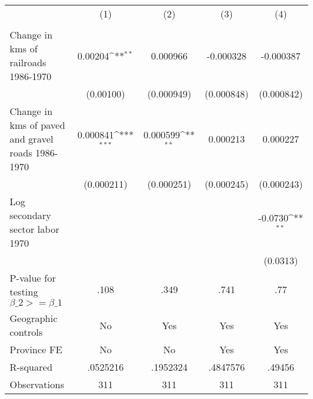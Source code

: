 {
\def\sym#1{\ifmmode^{#1}\else\(^{#1}\)\fi}
\begin{tabular}{l*{4}{c}}
\hline\hline
                &\multicolumn{1}{c}{(1)}&\multicolumn{1}{c}{(2)}&\multicolumn{1}{c}{(3)}&\multicolumn{1}{c}{(4)}\\
                &\multicolumn{1}{c}{}&\multicolumn{1}{c}{}&\multicolumn{1}{c}{}&\multicolumn{1}{c}{}\\
\hline
Change in kms of railroads 1986-1970&  0.00204\sym{**} & 0.000966         &-0.000328         &-0.000387         \\
                &(0.00100)         &(0.000949)         &(0.000848)         &(0.000842)         \\
[1em]
Change in kms of paved and gravel roads 1986-1970& 0.000841\sym{***}& 0.000599\sym{**} & 0.000213         & 0.000227         \\
                &(0.000211)         &(0.000251)         &(0.000245)         &(0.000243)         \\
[1em]
Log secondary sector labor 1970&                  &                  &                  &  -0.0730\sym{**} \\
                &                  &                  &                  & (0.0313)         \\
\hline
P-value for testing $\beta\_{2} >= \beta\_{1}$&     .108         &     .349         &     .741         &      .77         \\
Geographic controls&       No         &      Yes         &      Yes         &      Yes         \\
Province FE     &       No         &       No         &      Yes         &      Yes         \\
R-squared       & .0525216         & .1952324         & .4847576         &   .49456         \\
Observations    &      311         &      311         &      311         &      311         \\
\hline\hline
\end{tabular}
}
